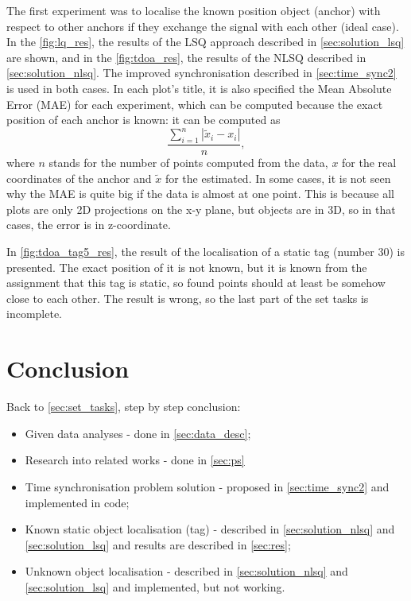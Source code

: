 \documentclass[journal]{IEEEtran}
\begin{document}
The first experiment was to localise the known position object (anchor) with respect to other anchors if they exchange the signal with each other (ideal case). 
In the \autoref{fig:lq_res}, the results of the LSQ approach described in \autoref{sec:solution_lsq} are shown, and in the \autoref{fig:tdoa_res}, the results of the NLSQ described in \autoref{sec:solution_nlsq}. 
The improved synchronisation described in \autoref{sec:time_sync2} is used in both cases. 
In each plot's title, it is also specified the Mean Absolute Error (MAE) for each experiment, which can be computed because the exact position of each anchor is known: it can be computed as 
\begin{equation}
    \frac{\sum_{i=1}^{n}|\tilde{x}_i - x_i|}{n},
\end{equation}
where $n$ stands for the number of points computed from the data, $x$ for the real coordinates of the anchor and $\tilde{x}$ for the estimated.
In some cases, it is not seen why the MAE is quite big if the data is almost at one point.
This is because all plots are only 2D projections on the x-y plane, but objects are in 3D, so in that cases, the error is in z-coordinate.

In \autoref{fig:tdoa_tag5_res}, the result of the localisation of a static tag (number 30) is presented.
The exact position of it is not known, but it is known from the assignment that this tag is static, so found points should at least be somehow close to each other.
The result is wrong, so the last part of the set tasks is incomplete.

\section{Conclusion}
Back to \autoref{sec:set_tasks}, step by step conclusion:
\begin{itemize}
    \item Given data analyses - done in \autoref{sec:data_desc};
    \item Research into related works - done in \autoref{sec:ps}
    \item Time synchronisation problem solution - proposed in \autoref{sec:time_sync2} and implemented in code;
    \item Known static object localisation (tag) - described in \autoref{sec:solution_nlsq} and \autoref{sec:solution_lsq} and results are described in \autoref{sec:res};
    \item Unknown object localisation - described in \autoref{sec:solution_nlsq} and \autoref{sec:solution_lsq} and implemented, but not working.
\end{itemize}
\end{document}
